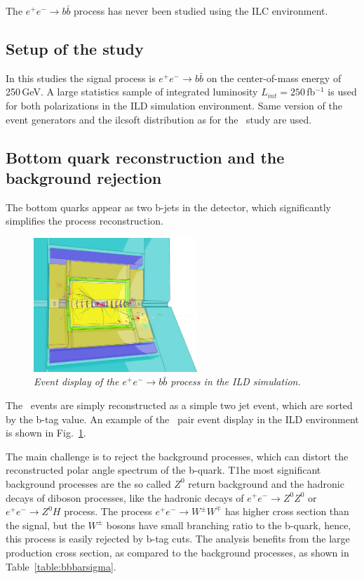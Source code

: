 The $e^+e^-\to b\bar{b}$ process has never been studied using the ILC environment. 
\subsection{Setup of the study}
In this studies the signal process is $e^+e^-\to b\bar{b}$ on the center-of-mass energy of 250\,GeV. 
A large statistics sample of integrated luminosity $L_{int}= 250$\,fb{$^{-1}$} is used for both polarizations in the ILD simulation environment. 
Same version of the event generators and the {\sc ilcsoft} distribution as for the \ttbar\ study are used.


\subsection{Bottom quark reconstruction and the background rejection}
The bottom quarks appear as two b-jets in the detector, which significantly simplifies the process reconstruction. 
\begin{figure}
	{\centering
		\includegraphics[clip, trim=0.cm 0cm 7.9cm 0cm, width=0.55\textwidth]{ILD/graphics/ild-bbbar.png}
		\caption{\sl Event display of the $e^+e^-\to b\bar{b}$ process in the ILD simulation.
		}
		\label{fig:BottomEvent_3}
	}
	
\end{figure}
The \bbbar\ events are simply reconstructed as a simple two jet event, which are sorted by the b-tag value.
An example of the \bbbar\ pair event display in the ILD environment is shown in Fig.~\ref{fig:BottomEvent_3}. 

The main challenge is to reject the background processes, which can distort the reconstructed polar angle spectrum of the b-quark. 
T1he most significant background processes are the so called $Z^0$ return background and the hadronic decays of diboson processes, like the hadronic decays of $e^+e^-\to Z^0Z^0$ or $e^+e^-\to Z^0H$ process. The process $e^+e^-\to W^\pm W^\mp$ has higher cross section than the signal, but the $W^\pm$ bosons have small branching ratio to the b-quark, hence, this process is easily rejected by b-tag cuts. 
The analysis benefits from the large production cross section, as compared to the background processes, as shown in Table~\ref{table:bbbarsigma}.

